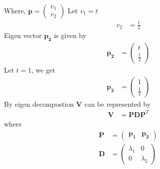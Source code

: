 \documentclass[journal,12pt,twocolumn]{IEEEtran}
\let\vec\mathbf
\numberwithin{equation}{subsection}
\newcommand{\myvec}[1]{\ensuremath{\begin{pmatrix}#1\end{pmatrix}}}
\begin{document}
Where, $\vec{p}=\myvec{v_1\\v_2}$
Let $v_1=t$
\begin{align}
    v_2&=\frac{t}{2}
\end{align}
Eigen vector $\vec{p_2}$ is given by
\begin{align}
    \vec{p_2}&=\myvec{t \\ \frac{t}{2}}
\end{align}
Let $t=1$, we get
\begin{align}
        \vec{p_2}&=\myvec{1 \\\frac{1 }{2}}\label{2.30}
\end{align}
By eigen decompostion $\vec{V}$ can be represented by
\begin{align}
    \vec{V}&=\vec{P}\vec{D}\vec{P}^T\label{2.31}
\end{align}
where 
\begin{align}
        \vec{P}&=\myvec{\vec{p_1} & \vec{p_2}}\label{2.32}\\
    \vec{D}&=\myvec{\lambda_1 & 0 \\0 & \lambda_2}\label{2.33}
\end{align}
\end{document}
